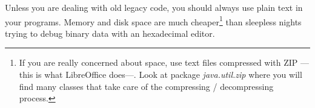 Unless you are dealing with old legacy code, you should always use
plain text in your programs. Memory and disk space are much 
cheaper\footnote{If you are really concerned about space, use text
  files compressed with ZIP ---this is what LibreOffice does---. Look
  at package \emph{java.util.zip} where you will find many classes
  that take care of the compressing / decompressing process.} 
than sleepless nights trying to debug binary data with an
hexadecimal editor. 




